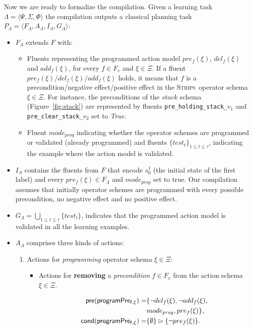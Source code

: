 \documentclass{article}
\newcommand{\tup}[1]{{\langle #1 \rangle}}
\newcommand{\pre}{\mathsf{pre}}     %
\newcommand{\cond}{\mathsf{cond}}   %
\newcommand{\strips}{\textsc{Strips}}     %
\begin{document}
Now we are ready to formalize the compilation. Given a learning task $\Lambda=\tup{\Psi,\Sigma,\Phi}$ the compilation outputs a classical planning task $P_{\Lambda}=\tup{F_{\Lambda},A_{\Lambda},I_{\Lambda},G_{\Lambda}}$:
\begin{itemize}
\item $F_{\Lambda}$ extends $F$ with:
\begin{itemize}
\item Fluents representing the programmed action model $pre_f(\xi)$, $del_f(\xi)$ and $add_f(\xi)$, for every $f\in F_v$ and $\xi \in \Xi$. If a fluent $pre_f(\xi)/del_f(\xi)/add_f(\xi)$ holds, it means that $f$ is a precondition/negative effect/positive effect in the \strips\ operator schema $\xi\in \Xi$. For instance, the preconditions of the $stack$ schema (Figure~\ref{fig:stack}) are represented by fluents {\small\tt pre\_holding\_stack\_$v_1$} and {\small\tt pre\_clear\_stack\_$v_2$} set to {\em True}.
\item Fluent $mode_{prog}$ indicating whether the operator schemes are programmed or validated (already programmed) and fluents $\{test_t\}_{1\leq t\leq \tau}$, indicating the example where the action model is validated.
\end{itemize}
\item $I_{\Lambda}$ contains the fluents from $F$ that encode $s_0^1$ (the initial state of the first label) and every $pre_f(\xi)\in F_{\Lambda}$ and $mode_{prog}$ set to true. Our compilation assumes that initially operator schemes are programmed with every possible precondition, no negative effect and no positive effect.
\item $G_{\Lambda}=\bigcup_{1\leq t\leq \tau}\{test_t\}$, indicates that the programmed action model is validated in all the learning examples.
\item $A_{\Lambda}$ comprises three kinds of actions:
\begin{enumerate}
\item Actions for {\em programming} operator schema $\xi\in\Xi$:
\begin{itemize}
\item Actions for {\bf removing} a {\em precondition} $f\in F_v$ from the action schema $\xi\in\Xi$.

\begin{small}
\begin{align*}
\hspace*{7pt}\pre(\mathsf{programPre_{f,\xi}})=&\{\neg del_{f}(\xi),\neg add_{f}(\xi),\\
& mode_{prog}, pre_{f}(\xi)\},\\
\cond(\mathsf{programPre_{f,\xi}})=&\{\emptyset\}\rhd\{\neg pre_{f}(\xi)\}.
\end{align*}
\end{small}


\end{itemize}
\end{enumerate}
\end{itemize}
\end{document}
